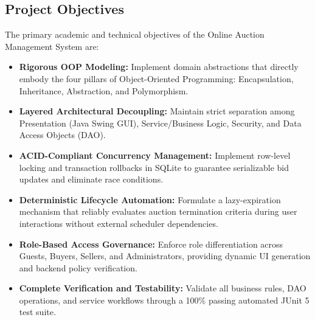 \subsection{Project Objectives}
The primary academic and technical objectives of the Online Auction Management System are:
\begin{itemize}
    \item \textbf{Rigorous OOP Modeling:} Implement domain abstractions that directly embody the four pillars of Object-Oriented Programming: Encapsulation, Inheritance, Abstraction, and Polymorphism.
    \item \textbf{Layered Architectural Decoupling:} Maintain strict separation among Presentation (Java Swing GUI), Service/Business Logic, Security, and Data Access Objects (DAO).
    \item \textbf{ACID-Compliant Concurrency Management:} Implement row-level locking and transaction rollbacks in SQLite to guarantee serializable bid updates and eliminate race conditions.
    \item \textbf{Deterministic Lifecycle Automation:} Formulate a lazy-expiration mechanism that reliably evaluates auction termination criteria during user interactions without external scheduler dependencies.
    \item \textbf{Role-Based Access Governance:} Enforce role differentiation across Guests, Buyers, Sellers, and Administrators, providing dynamic UI generation and backend policy verification.
    \item \textbf{Complete Verification and Testability:} Validate all business rules, DAO operations, and service workflows through a 100\% passing automated JUnit 5 test suite.
\end{itemize}

